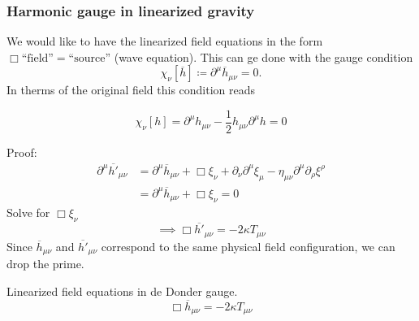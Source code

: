 \subsubsection{Harmonic gauge in linearized gravity}
We would like to have the linearized field equations in the form $\Box\text{``field''}=\text{``source''}$ (wave equation).
This can ge done with the gauge condition
\begin{equation}
    \chi_\nu \left[ \overline{h} \right] \coloneqq \partial^\mu \overline{h}_{\mu\nu} = 0.
\end{equation}
In therms of the original field this condition reads
\begin{definition}
    \begin{equation}
        \chi_\nu \left[ h \right] = \partial^\mu h_{\mu\nu} - \frac{1}{2} h_{\mu\nu} \partial^\mu h = 0
    \end{equation}
\end{definition}
Proof:
\begin{equation}
    \begin{split}
        \partial^\mu \overline{h'}_{\mu\nu} &= \partial^\mu \overline{h}_{\mu\nu} + \Box \xi_\nu + \partial_\nu \partial^\mu \xi_\mu -
        \eta_{\mu\nu} \partial^\mu\partial_\rho\xi^\rho \\
        &= \partial^\mu \overline{h}_{\mu\nu} + \Box \xi_\nu = 0
    \end{split}
\end{equation}
Solve for $\Box\xi_\nu$
\begin{equation}
    \implies \Box \overline{h'}_{\mu\nu} = -2\kappa T_{\mu\nu}
\end{equation}
Since $\overline{h}_{\mu\nu}$ and $\overline{h'}_{\mu\nu}$ correspond to the same physical field configuration, we can drop the prime.
\begin{definition}{Linearized field equations in de Donder gauge.}
    \begin{equation}
        \Box \overline{h}_{\mu\nu} = - 2 \kappa T_{\mu\nu}
    \end{equation}
\end{definition}